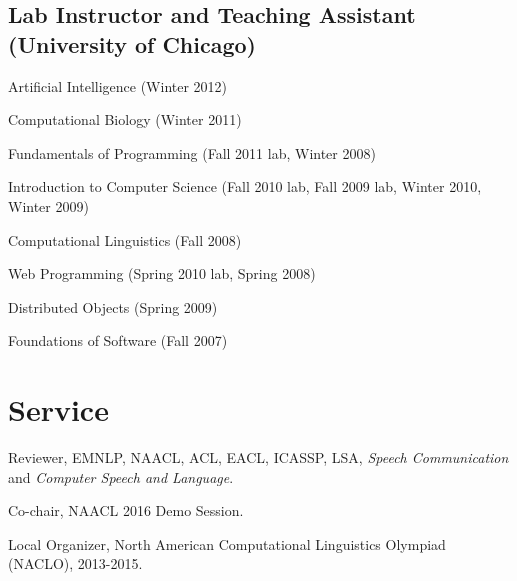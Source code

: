 \documentclass[10.5pt,letterpaper]{article}
\begin{document}
\subsection*{Lab Instructor and Teaching Assistant (University of Chicago)}

\begin{itemize*}
\item Artificial Intelligence (Winter 2012)
\item Computational Biology (Winter 2011)
\item Fundamentals of Programming (Fall 2011 lab, Winter 2008)
\item Introduction to Computer Science (Fall 2010 lab, Fall 2009 lab, Winter 2010, Winter 2009)
\item Computational Linguistics (Fall 2008)
\item Web Programming (Spring 2010 lab, Spring 2008)
\item Distributed Objects (Spring 2009)
\item Foundations of Software (Fall 2007)
\end{itemize*}

%


\section*{Service}

\begin{itemize*}

\item  Reviewer, EMNLP, NAACL, ACL, EACL, ICASSP, LSA, {\em Speech Communication} and {\em Computer Speech and Language}.

\item Co-chair, NAACL 2016 Demo Session.

\item Local Organizer, North American Computational Linguistics Olympiad (NACLO), 2013-2015. 

\end{itemize*}
\end{document}
